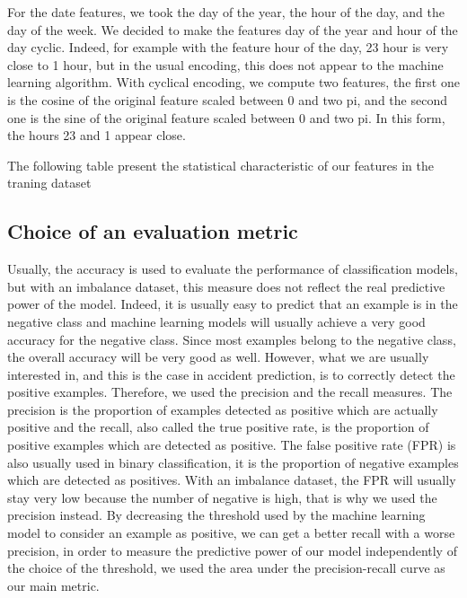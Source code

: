 \documentclass[conference]{IEEEtran}
\begin{document}
For the date features, we took the day of the year, the hour of the day, and the day of the week.
We decided to make the features day of the year and hour of the day cyclic.
Indeed, for example with the feature hour of the day, 23 hour is very close to 1 hour, but in the usual encoding, this does not appear to the machine learning algorithm.
With cyclical encoding, we compute two features, the first one is the cosine of the original feature scaled between 0 and two pi, and the second one is the sine of the original feature scaled between 0 and two pi.
In this form, the hours 23 and 1 appear close.

The following table present the statistical characteristic of our features in the traning dataset 

\subsection{Choice of an evaluation metric}
Usually, the accuracy is used to evaluate the performance of classification models, but with an imbalance dataset, this measure does not reflect the real predictive power of the model.
Indeed, it is usually easy to predict that an example is in the negative class and machine learning models will usually achieve a very good accuracy for the negative class.
Since most examples belong to the negative class, the overall accuracy will be very good as well.
However, what we are usually interested in, and this is the case in accident prediction, is to correctly detect the positive examples.
Therefore, we used the precision and the recall measures.
The precision is the proportion of examples detected as positive which are actually positive and the recall, also called the true positive rate, is the proportion of positive examples which are detected as positive.
The false positive rate (FPR) is also usually used in binary classification, it is the proportion of negative examples which are detected as positives.
With an imbalance dataset, the FPR will usually stay very low because the number of negative is high, that is why we used the precision instead.
By decreasing the threshold used by the machine learning model to consider an example as positive, we can get a better recall with a worse precision, in order to measure the predictive power of our model independently of the choice of the threshold, we used the area under the precision-recall curve as our main metric.
\end{document}
